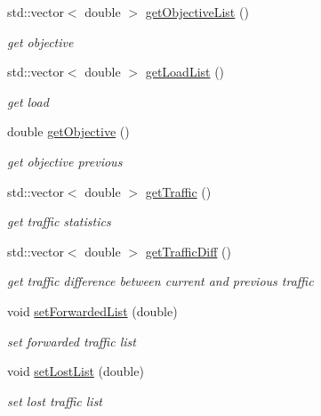 \begin{DoxyCompactItemize}
std::vector$<$ double $>$ \hyperlink{classstatistics_a47b6c911143330c41faa573bc534aee1}{getObjectiveList} ()
\begin{DoxyCompactList}\small\item\em get objective \item\end{DoxyCompactList}\item 
std::vector$<$ double $>$ \hyperlink{classstatistics_a170d529ea5d3c459755309e2de1d166e}{getLoadList} ()
\begin{DoxyCompactList}\small\item\em get load \item\end{DoxyCompactList}\item 
double \hyperlink{classstatistics_a8a09566df54f2ac183e0a40f452546a6}{getObjective} ()
\begin{DoxyCompactList}\small\item\em get objective previous \item\end{DoxyCompactList}\item 
std::vector$<$ double $>$ \hyperlink{classstatistics_af512ba48d195d791b927bc49e2c40188}{getTraffic} ()
\begin{DoxyCompactList}\small\item\em get traffic statistics \item\end{DoxyCompactList}\item 
std::vector$<$ double $>$ \hyperlink{classstatistics_a7aa58e77f08e583a87f9050a5b1cf4f9}{getTrafficDiff} ()
\begin{DoxyCompactList}\small\item\em get traffic difference between current and previous traffic \item\end{DoxyCompactList}\item 
void \hyperlink{classstatistics_a94f979fcc6d511583638d6fc12116992}{setForwardedList} (double)
\begin{DoxyCompactList}\small\item\em set forwarded traffic list \item\end{DoxyCompactList}\item 
void \hyperlink{classstatistics_a84bead3d62e23af1777b5e54c6de48de}{setLostList} (double)
\begin{DoxyCompactList}\small\item\em set lost traffic list \item\end{DoxyCompactList}\item 

\end{DoxyCompactItemize}
